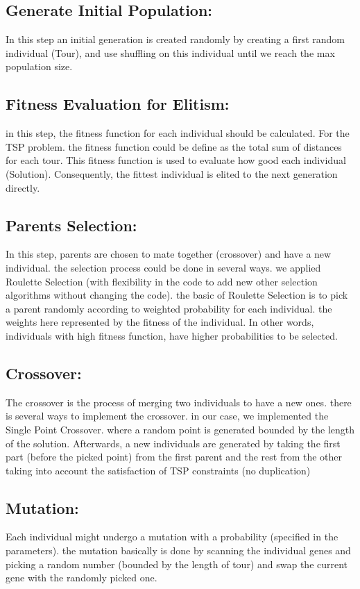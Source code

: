 \documentclass[14pt, english]{article}
\begin{document}
\subsection{Generate Initial Population:}
In this step an initial generation is created randomly by creating a first random individual (Tour), and use shuffling on this individual until we reach the max population size. 
\subsection{Fitness Evaluation for Elitism:}
in this step, the fitness function for each individual should be calculated. For the TSP problem. the fitness function could be define as the total sum of distances for each tour.
This fitness function is used to evaluate how good each individual (Solution). Consequently, the fittest individual is elited to the next generation directly.
\subsection{Parents Selection:}
In this step, parents are chosen to mate together (crossover) and have a new individual. the selection process could be done in several ways. we applied Roulette Selection (with flexibility in the code to add new other selection algorithms without changing the code).
the basic of Roulette Selection is to pick a parent randomly according to weighted probability for each individual. the weights here represented by the fitness of the individual. In other words, individuals with high fitness function, have higher probabilities to be selected.
\subsection{Crossover:}
The crossover is the process of merging two individuals to have a new ones. there is several ways to implement the crossover. in our case, we implemented the Single Point Crossover. where a random point is generated bounded by the length of the solution. Afterwards, a new individuals are generated by taking the first part (before the picked point) from the first parent and the rest from the other taking into account the satisfaction of TSP constraints (no duplication) 
\subsection{Mutation:}
Each individual might undergo a mutation with a probability (specified in the parameters). the mutation basically is done by scanning the individual genes and picking a random number (bounded by the length of tour) and swap the current gene with the randomly picked one.
\end{document}
